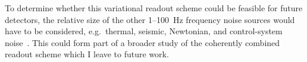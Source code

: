 To determine whether this variational readout scheme could be feasible for future detectors, the relative size of the other 1--100~Hz frequency noise sources would have to be considered, e.g.\ thermal, seismic, Newtonian, and control-system noise~\cite{buikemaSensitivityPerformanceAdvanced2020}.
This could form part of a broader study of the coherently combined readout scheme which I leave to future work.


